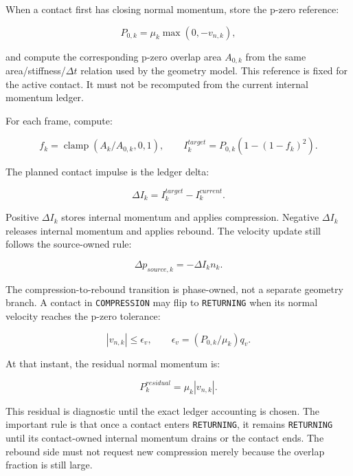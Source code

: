 When a contact first has closing normal momentum, store the p-zero reference:

\begin{equation}
P_{0,k} = \mu_k \max(0,-v_{n,k}),
\end{equation}

and compute the corresponding p-zero overlap area \(A_{0,k}\) from the same
area/stiffness/\(\Delta t\) relation used by the geometry model.  This
reference is fixed for the active contact.  It must not be recomputed from the
current internal momentum ledger.

For each frame, compute:

\begin{equation}
f_k = \operatorname{clamp}(A_k/A_{0,k},0,1),
\qquad
I^{target}_{k} = P_{0,k}\left(1-\left(1-f_k\right)^2\right).
\end{equation}

The planned contact impulse is the ledger delta:

\begin{equation}
\Delta I_k = I^{target}_{k} - I^{current}_{k}.
\end{equation}

Positive \(\Delta I_k\) stores internal momentum and applies compression.
Negative \(\Delta I_k\) releases internal momentum and applies rebound.  The
velocity update still follows the source-owned rule:

\begin{equation}
\Delta p_{source,k} = -\Delta I_k n_k.
\end{equation}

The compression-to-rebound transition is phase-owned, not a separate geometry
branch.  A contact in \texttt{COMPRESSION} may flip to \texttt{RETURNING} when
its normal velocity reaches the p-zero tolerance:

\begin{equation}
|v_{n,k}| \leq \epsilon_v,
\qquad
\epsilon_v = (P_{0,k}/\mu_k)q_v.
\end{equation}

At that instant, the residual normal momentum is:

\begin{equation}
P^{residual}_{k} = \mu_k |v_{n,k}|.
\end{equation}

This residual is diagnostic until the exact ledger accounting is chosen.  The
important rule is that once a contact enters \texttt{RETURNING}, it remains
\texttt{RETURNING} until its contact-owned internal momentum drains or the
contact ends.  The rebound side must not request new compression merely because
the overlap fraction is still large.

